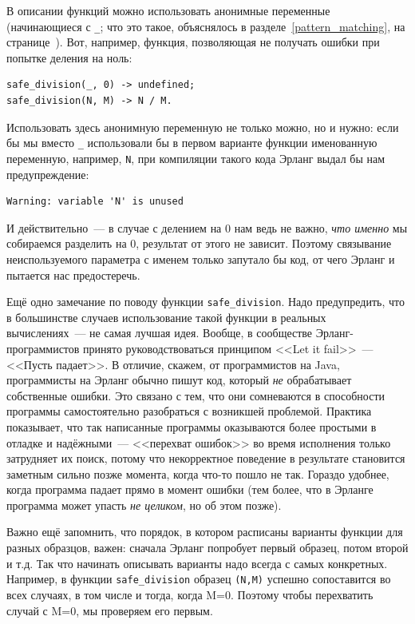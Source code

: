\documentclass[
  paper=a4,
  fontsize=14pt,
  openany,
  appendixprefix=true
]{scrbook}
\begin{document}
В описании функций можно использовать анонимные переменные (начинающиеся с \lstinline{_}; что это такое, объяснялось в разделе~\ref{pattern_matching}, на странице~\pageref{anonymous}). Вот, например, функция, позволяющая не получать ошибки при попытке деления на ноль:
\begin{lstlisting}
safe_division(_, 0) -> undefined;
safe_division(N, M) -> N / M.
\end{lstlisting}
\label{safe_division}

Использовать здесь анонимную переменную не только можно, но и нужно: если бы мы вместо \lstinline{_} использовали бы в первом варианте функции именованную переменную, например, \lstinline{N}, при компиляции такого кода Эрланг выдал бы нам предупреждение:
\begin{lstlisting}
Warning: variable 'N' is unused
\end{lstlisting}

И действительно~--- в случае с делением на 0 нам ведь не важно, \emph{что именно} мы собираемся разделить на 0, результат от этого не зависит. Поэтому связывание неиспользуемого параметра с именем только запутало бы код, от чего Эрланг и пытается нас предостеречь.

Ещё одно замечание по поводу функции \lstinline{safe_division}. Надо предупредить, что в большинстве случаев использование такой функции в реальных вычислениях~--- не самая лучшая идея. Вообще, в сообществе Эрланг-программистов принято руководствоваться принципом <<Let it fail>>~--- <<Пусть падает>>. В отличие, скажем, от программистов на Java, программисты на Эрланг обычно пишут код, который \emph{не} обрабатывает собственные ошибки. Это связано с тем, что они сомневаются в способности программы самостоятельно разобраться с возникшей проблемой. Практика показывает, что так написанные программы оказываются более простыми в отладке и надёжными~--- <<перехват ошибок>> во время исполнения только затрудняет их поиск, потому что некорректное поведение в результате становится заметным сильно позже момента, когда что-то пошло не так. Гораздо удобнее, когда программа падает прямо в момент ошибки (тем более, что в Эрланге программа может упасть \emph{не целиком}, но об этом позже).

Важно ещё запомнить, что порядок, в котором расписаны варианты функции для разных образцов, важен: сначала Эрланг попробует первый образец, потом второй и т.д. Так что начинать описывать варианты надо всегда с самых конкретных. Например, в функции \lstinline{safe_division} образец \lstinline{(N,M)} успешно сопоставится во всех случаях, в том числе и тогда, когда M=0. Поэтому чтобы перехватить случай с M=0, мы проверяем его первым.
\end{document}
